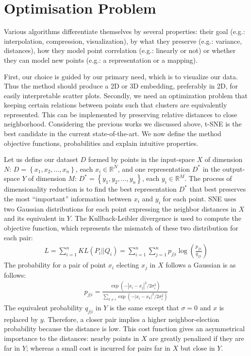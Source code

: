 \documentclass[a4paper,12pt]{report}
\newcommand{\R}{\mathbb{R}}
\newcommand{\eg}{e.g.}
\begin{document}
\section{Optimisation Problem}
Various algorithms differentiate themselves by several properties: their goal (\eg: interpolation, compression, visualization), by what they preserve (\eg: variance, distances), how they model point correlation (\eg: linearly or not) or whether they can model new points (\eg: a representation or a mapping).

First, our choice is guided by our primary need, which is to visualize our data.
Thus the method should produce a 2D or 3D embedding, preferably in 2D, for easily interpretable scatter plots.
Secondly, we need an optimization problem that keeping certain relations between points such that clusters are equivalently represented.
This can be implemented by preserving relative distances to close neighborhood.
Considering the previous works we discussed above, t-SNE is the best candidate in the current state-of-the-art.
We now define the method objective functions, probabilities and explain intuitive properties.

Let us define our dataset $D$ formed by points in the input-space $X$ of dimension $N$: $D = \left\{ x_1, x_2, \dots, x_n \right\}$, each $x_i \in \R^N$, and one representation $D^\ast$ in the output-space $Y$ of dimension $M$: $D^\ast = \left\{ y_1, y_2, \dots, y_n \right\}$, each $y_i \in \R^M$.
The process of dimensionality reduction is to find the best representation $D^\ast$ that best preserves the most ``important'' information between $x_i$ and $y_i$ for each point.
SNE uses two Gaussian distributions for each point expressing the neighbor distances in $X$ and its equivalent in $Y$.
The Kullback-Leibler divergence is used to compute the objective function, which represents the mismatch of these two distribution for each pair:
\begin{eqnarray}
    L = \sum_{i=1}^n KL(P_i || Q_i) = \sum_{i=1}^n \sum_{j=1}^n p_{j|i} \log\left(\frac{p_{j|i}}{q_{j|i}}\right)
\end{eqnarray}
The probability for a pair of point $x_i$ electing $x_j$ in $X$ follows a Gaussian is as follows:
\begin{eqnarray}
    p_{j|i} = \frac{\exp(-|x_i - x_j|^2 / 2 \sigma_i^2)}{\sum_{k \not = i} \exp(-|x_i - x_k|^2 / 2 \sigma_i^2 )}
\end{eqnarray}
The equivalent probability $q_{j|i}$ in $Y$ is the same except that $\sigma = 0$ and $x$ is replaced by $y$.
Therefore, a closer pair implies a higher neighbor-election probability because the distance is low.
This cost function gives an asymmetrical importance to the distances: nearby points in $X$ are greatly penalized if they are far in $Y$; whereas a small cost is incurred for pairs far in $X$ but close in $Y$.
\end{document}
